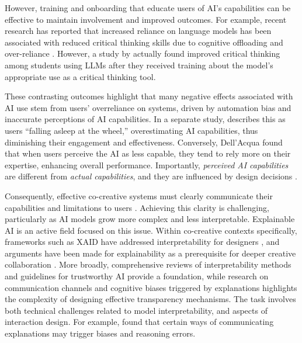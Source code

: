 However, training and onboarding that educate users of AI's capabilities can be effective to maintain involvement and improved outcomes. For example, recent research has reported that increased reliance on language models has been associated with reduced critical thinking skills due to cognitive offloading and over-reliance \citep{Gerlich2025-as, Lee2025-dw}. However, a study by \citet{Essel2024-qc} actually found improved critical thinking among students using LLMs after they received training about the model's appropriate use as a critical thinking tool.

These contrasting outcomes highlight that many negative effects associated with AI use stem from users' overreliance on systems, driven by automation bias and inaccurate perceptions of AI capabilities. In a separate study, \citet{DellAcqua2022-dy} describes this as users ``falling asleep at the wheel,'' overestimating AI capabilities, thus diminishing their engagement and effectiveness. Conversely, Dell'Acqua found that when users perceive the AI as less capable, they tend to rely more on their expertise, enhancing overall performance. Importantly, \textit{perceived AI capabilities} are different from \textit{actual capabilities}, and they are influenced by design decisions \citep{Moruzzi2022-tx, Lawton2023-tb}.

Consequently, effective co-creative systems must clearly communicate their capabilities and limitations to users \citep{Buschek2021-ks}. Achieving this clarity is challenging, particularly as AI models grow more complex and less interpretable. Explainable AI is an active field focused on this issue. Within co-creative contexts specifically, frameworks such as XAID have addressed interpretability for designers \citep{Zhu2018-zd}, and arguments have been made for explainability as a prerequisite for deeper creative collaboration \citep{Llano2022-ti}. More broadly, comprehensive reviews of interpretability methods \citep{Linardatos2020-uq} and guidelines for trustworthy AI \citep{Shneiderman2020-je} provide a foundation, while research on communication channels \citep{Newn2020-mv, Gomez2023-bp} and cognitive biases triggered by explanations \citep{El-Assady2022-qc} highlights the complexity of designing effective transparency mechanisms. The task involves both technical challenges related to model interpretability, and aspects of interaction design. For example, \citet{El-Assady2022-qc} found that certain ways of communicating explanations may trigger biases and reasoning errors.

